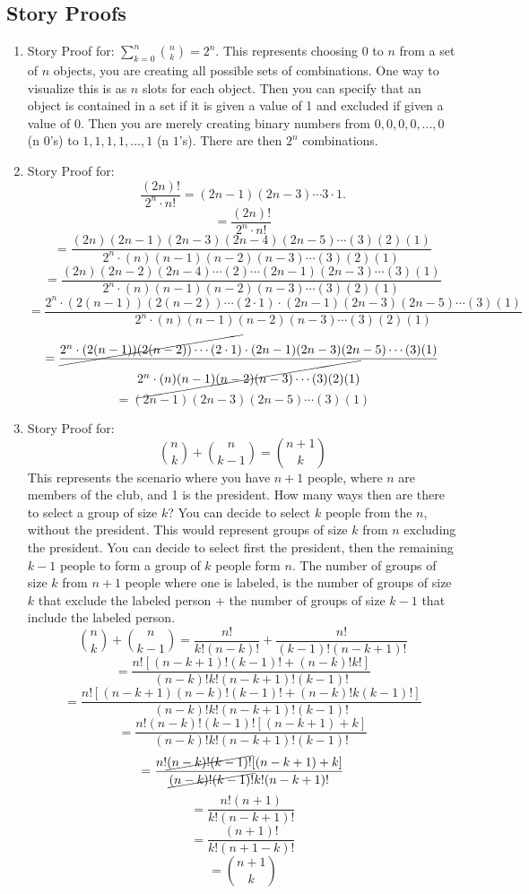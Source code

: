 \documentclass[11pt, oneside]{article}   	%
\begin{document}
\subsection{Story Proofs}
	\begin{enumerate}
		\item Story Proof for: $\sum_{k=0}^{n} \binom{n}{k} = 2^{n}$. This represents choosing 0 to $n$ from a set of $n$ objects, you are creating all possible sets of combinations. One way to visualize this is as $n$ slots for each object. Then you can specify that an object is contained in a set if it is given a value of 1 and excluded if given a value of 0. Then you are merely creating binary numbers from $0,0,0,0,...,0$ (n $0$'s) to $1,1,1,1,...,1$ (n $1$'s). There are then $2^{n}$ combinations.
		\item Story Proof for:
			\[
				\frac{(2n)!}{2^{n} \cdot n!} = (2n - 1)(2n - 3) \cdots 3 \cdot 1.
			\]
			\[
				= \frac{(2n)!}{2^{n} \cdot n!}
			\]
			\[
				= \frac{(2n)(2n-1)(2n-3)(2n-4)(2n-5) \cdots (3)(2)(1)}{2^{n} \cdot (n)(n-1)(n-2)(n-3) \cdots (3)(2)(1)}
			\]
			\[
				= \frac{(2n)(2n-2)(2n-4)  \cdots (2) \cdots (2n-1)(2n-3) \cdots (3)(1)}{2^{n} \cdot (n)(n-1)(n-2)(n-3) \cdots (3)(2)(1)}
			\]
			\[
				= \frac{2^{n} \cdot (2(n-1))(2(n-2)) \cdots (2 \cdot 1) \cdot (2n-1)(2n-3)(2n-5) \cdots (3)(1)}{2^{n} \cdot (n)(n-1)(n-2)(n-3) \cdots (3)(2)(1)}
			\]
			\vspace{4mm}
			\[
				= \frac{ \cancel{2^{n} \cdot (2(n-1))(2(n-2)) \cdots (2 \cdot 1)} \cdot (2n-1)(2n-3)(2n-5) \cdots (3)(1)}{\cancel{2^{n} \cdot (n)(n-1)(n-2)(n-3) \cdots (3)(2)(1)}}
			\]
			\vspace{4mm}
			\[
				= (2n-1)(2n-3)(2n-5) \cdots (3)(1)
			\]
		\item Story Proof for:
			\[
				\binom{n}{k} + \binom{n}{k-1} = \binom{n + 1}{k}
			\]
			This represents the scenario where you have $n + 1$ people, where $n$ are members of the club, and 1 is the president. How many ways then are there to select a group of size $k$? You can decide to select $k$ people from the $n$, without the president. This would represent groups of size $k$ from $n$ excluding the president. You can decide to select first the president, then the remaining $k-1$ people to form a group of $k$ people form $n$. The number of groups of size $k$ from $n+1$ people where one is labeled, is the number of groups of size $k$ that exclude the labeled person $+$ the number of groups of size $k-1$ that include the labeled person.
			\[
				\binom{n}{k} + \binom{n}{k-1} = \frac{n!}{k!(n-k)!} + \frac{n!}{(k-1)!(n-k+1)!}
			\]
			\[
				= \frac{n![(n-k+1)!(k-1)! + (n-k)!k!]}{(n-k)!k!(n-k+1)!(k-1)!}
			\]
			\[
				= \frac{n![(n-k+1)(n-k)!(k-1)! + (n-k)!k(k-1)!]}{(n-k)!k!(n-k+1)!(k-1)!}
			\]
			\[
				= \frac{n!(n-k)!(k-1)![(n-k+1) + k]}{(n-k)!k!(n-k+1)!(k-1)!}
			\]
			\[
				= \frac{n! \cancel{(n-k)!(k-1)!}[(n-k+1) + k]}{ \cancel{(n-k)!(k-1)!}k!(n-k+1)!}
			\]
			\[
				= \frac{n!(n+1)}{k!(n-k+1)!}
			\]
			\[
				= \frac{(n+1)!}{k!(n+1-k)!}
			\]
			\[
				= \binom{n+1}{k}
			\]
	\end{enumerate}
	
\end{document}
